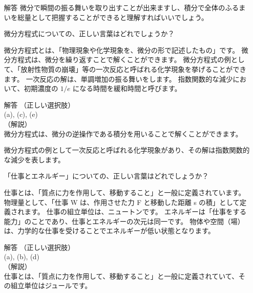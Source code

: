 \documentclass[uplatex,dvipdfmx,a4paper,11pt]{jsarticle}
\begin{document}
\begin{qlist}
\begin{itembox}[l]{解答}
            微分で瞬間の振る舞いを取り出すことが出来ますし、積分で全体のふるまいを総量として把握することができると理解すればいいでしょう。
        \end{itembox}
	\qitem 微分方程式についての、正しい言葉はどれでしょうか？
		\begin{qlist2}
			\qitem 微分方程式とは、「物理現象や化学現象を、微分の形で記述したもの」です。
			\qitem 微分方程式は、微分を繰り返すことで解くことができます。
			\qitem 微分方程式の例として、「放射性物質の崩壊」等の一次反応と呼ばれる化学現象を挙げることができます。
			\qitem 一次反応の解は、単調増加の振る舞いをします。
			\qitem 指数関数的な減少において、初期濃度の $1/e$ になる時間を緩和時間と呼びます。
		\end{qlist2}
        \vspace{3mm}
        \begin{itembox}[l]{解答}
            （正しい選択肢）\\
            (a), (c), (e)\\
            （解説）\\
            微分方程式は、微分の逆操作である積分を用いることで解くことができます。

            微分方程式の例として一次反応と呼ばれる化学現象があり、その解は指数関数的な減少を表します。
        \end{itembox}
	\qitem 「仕事とエネルギー」についての、正しい言葉はどれでしょうか？
		\begin{qlist2}
			\qitem 仕事とは、「質点に力を作用して、移動すること」と一般に定義されています。
			\qitem 物理量として、「仕事 W は、作用させた力 F と移動した距離 s の積」として定義されます。
			\qitem 仕事の組立単位は、ニュートンです。
			\qitem エネルギーは「仕事をする能力」のことであり、仕事とエネルギーの次元は同一です。
			\qitem 物体や空間（場）は、力学的な仕事を受けることでエネルギーが低い状態となります。
		\end{qlist2}
        \vspace{3mm}
        \begin{itembox}[l]{解答}
            （正しい選択肢）\\
            (a), (b), (d)\\
            （解説）\\
            仕事とは、「質点に力を作用して、移動すること」と一般に定義されていて、その組立単位はジュールです。


\end{itembox}
\end{qlist}
\end{document}
